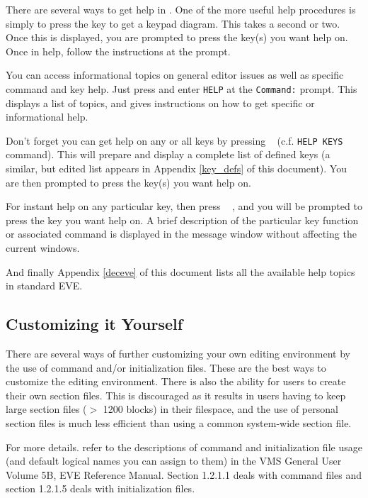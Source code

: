 There are several ways to get help in \STEve. One of the more useful help
procedures is simply to press the  key to get a keypad diagram.
This takes a second or two. Once this is displayed, you are prompted to press
the key(s) you want help on. Once in help, follow the instructions at the
prompt.

You can access informational topics on general editor issues as well as
specific command and key help. Just press  and enter {\tt HELP} at
the {\tt Command:} prompt. This displays a list of topics, and gives 
instructions on how to get specific or informational help.

Don't forget you can get help on any or all keys by pressing
\gold\  (c.f. {\tt HELP KEYS} command). This will prepare and
display a complete list of defined keys (a similar, but edited list appears in
Appendix \ref{key_defs} of this document). You are then prompted to press the 
key(s) you want help on.

For instant help on any particular key, then press \gold\  , and
you will be prompted to press the key you want help on. A brief description of
the particular key function or associated command is displayed in the message
window without affecting the current windows.

And finally Appendix \ref{deceve} of this document lists all the available 
help topics in standard EVE.

\subsection{Customizing it Yourself}

There are several ways of further customizing your own editing environment by
the use of command and/or initialization files. These are the best ways to
customize the editing environment. There is also the ability for users to
create their own section files. This is discouraged as it results in users
having to keep large section files ($>$ 1200 blocks) in their filespace, and
the use of personal section files is much less efficient than using a common
system-wide section file. 

For more details. refer to the descriptions of command and initialization file
usage (and default logical names you can assign to them) in the VMS General
User Volume 5B, EVE Reference Manual. Section 1.2.1.1 deals with command files
and section 1.2.1.5 deals with initialization files.

\newpage

